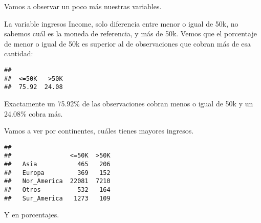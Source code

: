 \documentclass[]{article}
\newenvironment{Shaded}{\begin{snugshade}}{\end{snugshade}}
\newcommand{\DataTypeTok}[1]{\textcolor[rgb]{0.13,0.29,0.53}{#1}}
\newcommand{\DecValTok}[1]{\textcolor[rgb]{0.00,0.00,0.81}{#1}}
\newcommand{\KeywordTok}[1]{\textcolor[rgb]{0.13,0.29,0.53}{\textbf{#1}}}
\newcommand{\NormalTok}[1]{#1}
\newcommand{\OperatorTok}[1]{\textcolor[rgb]{0.81,0.36,0.00}{\textbf{#1}}}
\newcommand{\StringTok}[1]{\textcolor[rgb]{0.31,0.60,0.02}{#1}}
\begin{document}
Vamos a observar un poco más nuestras variables.

La variable ingresos Income, solo diferencia entre menor o igual de 50k,
no sabemos cuál es la moneda de referencia, y más de 50k. Vemos que el
porcentaje de menor o igual de 50k es superior al de observaciones que
cobran más de esa cantidad:

\begin{Shaded}
\end{Shaded}

\begin{verbatim}
## 
##  <=50K   >50K 
##  75.92  24.08
\end{verbatim}

Exactamente un 75.92\% de las observaciones cobran menos o igual de 50k
y un 24.08\% cobra más.

Vamos a ver por continentes, cuáles tienes mayores ingresos.

\begin{Shaded}
\end{Shaded}

\begin{verbatim}
##              
##                <=50K  >50K
##   Asia           465   206
##   Europa         369   152
##   Nor_America  22081  7210
##   Otros          532   164
##   Sur_America   1273   109
\end{verbatim}

Y en porcentajes.

\begin{Shaded}
\end{Shaded}
\end{document}
